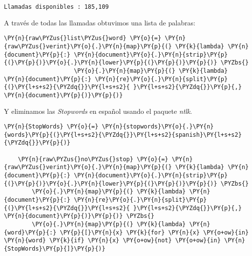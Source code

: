     \begin{Verbatim}[commandchars=\\\{\}]
Llamadas disponibles : 185,109
    \end{Verbatim}
    
    
 A través de todas las llamadas obtuvimos una lista de palabras: 
    \vspace{0.5cm}
    
        \begin{tcolorbox}[breakable, size=fbox, boxrule=1pt, pad at break*=1mm,colback=cellbackground, colframe=cellborder]
    \begin{Verbatim}[commandchars=\\\{\}]
    \PY{n}{raw\PYZus{}list\PYZus{}word} \PY{o}{=} \PY{n}{raw\PYZus{}verint}\PY{o}{.}\PY{n}{map}\PY{p}{(} \PY{k}{lambda} \PY{n}{document}\PY{p}{:} \PY{n}{document}\PY{o}{.}\PY{n}{strip}\PY{p}{(}\PY{p}{)}\PY{o}{.}\PY{n}{lower}\PY{p}{(}\PY{p}{)}\PY{p}{)} \PYZbs{}
                    \PY{o}{.}\PY{n}{map}\PY{p}{(} \PY{k}{lambda} \PY{n}{document}\PY{p}{:} \PY{n}{re}\PY{o}{.}\PY{n}{split}\PY{p}{(}\PY{l+s+s2}{\PYZdq{}}\PY{l+s+s2}{ }\PY{l+s+s2}{\PYZdq{}}\PY{p}{,} \PY{n}{document}\PY{p}{)}\PY{p}{)}
    \end{Verbatim}
    \end{tcolorbox}
    
    
    
Y eliminamos las \textit{Stopwords} en español usando el paquete \textit{ntlk}.

\vspace{0.5cm}
    
        \begin{tcolorbox}[breakable, size=fbox, boxrule=1pt, pad at break*=1mm,colback=cellbackground, colframe=cellborder]
    \begin{Verbatim}[commandchars=\\\{\}]
    \PY{n}{StopWords} \PY{o}{=} \PY{n}{stopwords}\PY{o}{.}\PY{n}{words}\PY{p}{(}\PY{l+s+s2}{\PYZdq{}}\PY{l+s+s2}{spanish}\PY{l+s+s2}{\PYZdq{}}\PY{p}{)}
    
    \PY{n}{raw\PYZus{}no\PYZus{}stop} \PY{o}{=} \PY{n}{raw\PYZus{}verint}\PY{o}{.}\PY{n}{map}\PY{p}{(} \PY{k}{lambda} \PY{n}{document}\PY{p}{:} \PY{n}{document}\PY{o}{.}\PY{n}{strip}\PY{p}{(}\PY{p}{)}\PY{o}{.}\PY{n}{lower}\PY{p}{(}\PY{p}{)}\PY{p}{)} \PYZbs{}
    	\PY{o}{.}\PY{n}{map}\PY{p}{(} \PY{k}{lambda} \PY{n}{document}\PY{p}{:} \PY{n}{re}\PY{o}{.}\PY{n}{split}\PY{p}{(}\PY{l+s+s2}{\PYZdq{}}\PY{l+s+s2}{ }\PY{l+s+s2}{\PYZdq{}}\PY{p}{,} \PY{n}{document}\PY{p}{)}\PY{p}{)} \PYZbs{}
        \PY{o}{.}\PY{n}{map}\PY{p}{(} \PY{k}{lambda} \PY{n}{word}\PY{p}{:} \PY{p}{[}\PY{n}{x} \PY{k}{for} \PY{n}{x} \PY{o+ow}{in} \PY{n}{word} \PY{k}{if} \PY{n}{x} \PY{o+ow}{not} \PY{o+ow}{in} \PY{n}{StopWords}\PY{p}{]}\PY{p}{)}
    \end{Verbatim}
    \end{tcolorbox}
    
